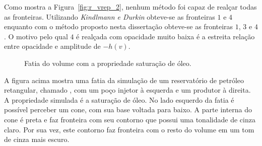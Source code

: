 	Como mostra a Figura~\ref{fig:r_vrep_2}, nenhum método foi capaz de realçar todas as fronteiras. Utilizando \textit{Kindlmann e Durkin} obteve-se as fronteiras $ 1 $ e $ 4 $ enquanto com o método proposto nesta dissertação obteve-se as fronteiras $ 1 $, $ 3 $ e $ 4 $. O motivo pelo qual $ 4 $ é realçada com opacidade muito baixa é a estreita relação entre opacidade e amplitude de $ -h(v) $.
	
\begin{figure}[h]
	\centering
	\caption{Fatia do volume  com a propriedade saturação de óleo.}
\end{figure}

	A figura acima mostra uma fatia da simulação de um reservatório de petróleo retangular, chamado , com um poço injetor à esquerda e um produtor à direita. A propriedade simulada é a saturação de óleo. No lado esquerdo da fatia é possível perceber um cone, com sua base voltada para baixo. A parte interna do cone é preta e faz fronteira com seu contorno que possui uma tonalidade de cinza claro. Por sua vez, este contorno faz fronteira com o resto do volume em um tom de cinza mais escuro.

